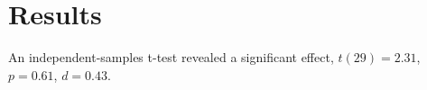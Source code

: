 \section{Results}
An independent-samples t-test revealed a significant effect,
$t(29) = 2.31$, $p = 0.61$, $d = 0.43$.
